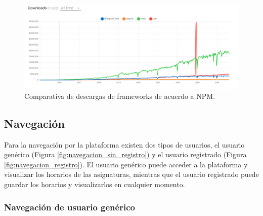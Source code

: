 \begin{figure}[H]
    \centering
    \includegraphics[width=1\textwidth]{./imagenes/Comparativa.png}
    \caption{Comparativa de descargas de frameworks de acuerdo a NPM.}
\end{figure}

\newpage

\subsection{Navegación}

Para la navegación por la plataforma existen dos tipos de usuarios, el usuario genérico (Figura \ref{fig:navegacion_sin_registro}) y el usuario registrado (Figura \ref{fig:navegacion_registro}). El usuario genérico puede acceder a la plataforma y visualizar los horarios de las asignaturas, mientras que el usuario registrado puede guardar los horarios y visualizarlos en cualquier momento.\newline

\subsubsection*{Navegación de usuario genérico}

